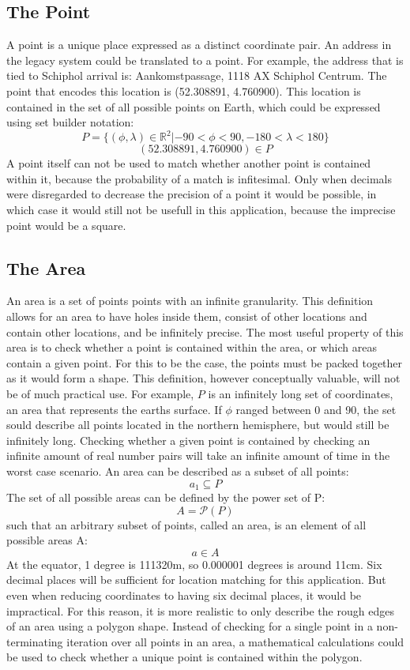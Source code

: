 \subsection{The Point}
A point is a unique place expressed as a distinct coordinate pair. An address in the legacy system could be translated to a point. For example, the address that is tied to Schiphol arrival is: Aankomstpassage, 1118 AX Schiphol Centrum.
The point that encodes this location is (52.308891, 4.760900). This location is contained in the set of all possible points on Earth, which could be expressed using set builder notation:
\[P = \{(\phi,\lambda) \in \mathbb{R}^2 | -90 < \phi < 90, -180 < \lambda < 180 \}\]
\[(52.308891, 4.760900) \in P\]
A point itself can not be used to match whether another point is contained within it, because the probability of a match is infitesimal. Only when decimals were disregarded to decrease the precision of a point it would be possible, in which case it would still not be usefull in this application, because the imprecise point would be a square.

\subsection{The Area}
An area is a set of points points with an infinite granularity. This definition allows for an area to have holes inside them, consist of other locations and contain other locations, and be infinitely precise. The most useful property of this area is to check whether a point is contained within the area, or which areas contain a given point. For this to be the case, the points must be packed together as it would form a shape. This definition, however conceptually valuable, will not be of much practical use. For example, $P$ is an infinitely long set of coordinates, an area that represents the earths surface. If $\phi$ ranged between 0 and 90, the set sould describe all points located in the northern hemisphere, but would still be infinitely long. Checking whether a given point is contained by checking an infinite amount of real number pairs will take an infinite amount of time in the worst case scenario. An area can be described as a subset of all points:
\[a_1 \subseteq P \]
The set of all possible areas can be defined by the power set of P:
\[A = \mathcal{P}(P)\]
such that an arbitrary subset of points, called an area, is an element of all possible areas A:
\[a \in A\]
At the equator, 1 degree is 111320m, so 0.000001 degrees is
around 11cm. Six decimal places will be sufficient for location matching for this application. But even when reducing coordinates to having six decimal places, it would be impractical. For this reason, it is more realistic to only describe the rough edges of an area using a polygon shape. Instead of checking for a single point in a non-terminating iteration over all points in an area, a mathematical calculations could be used to check whether a unique point is contained within the polygon.

